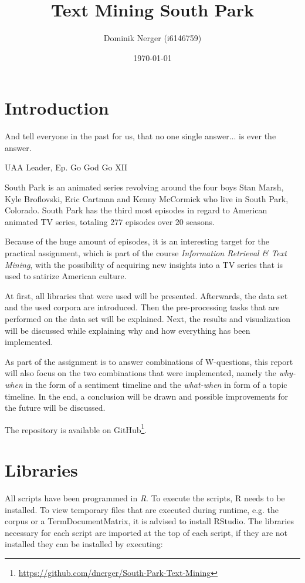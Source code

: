 \documentclass[10pt,a4paper]{article}
\author{Dominik Nerger (i6146759)}
\title{Text Mining South Park}
\date{\today}
\begin{document}
	\maketitle
	
	\tableofcontents
	\newpage
	\clearpage
	\setcounter{page}{1}
	\section{Introduction}
	\epigraph{ And tell everyone in the past for us, that no one single answer... is ever the answer. }{UAA Leader, Ep. Go God Go XII}

	South Park is an animated series revolving around the four boys Stan Marsh, Kyle Broflovski, Eric Cartman and Kenny McCormick who live in South Park, Colorado. South Park has the third most episodes in regard to American animated TV series, totaling 277 episodes over 20 seasons. 
	
	Because of the huge amount of episodes, it is an interesting target for the practical assignment, which is part of the course \textit{Information Retrieval \& Text Mining}, with the possibility of acquiring new insights into a TV series that is used to satirize American culture. 

	
	At first, all libraries that were used will be presented. Afterwards, the data set and the used corpora are introduced.  Then the pre-processing tasks that are performed on the data set will be explained. Next, the results and visualization will be discussed while explaining why and how everything has been implemented.
	
	
	As part of the assignment is to answer combinations of W-questions, this report will also focus on the two combinations that were implemented, namely the \textit{why-when} in the form of a sentiment timeline and the \textit{what-when} in form of a topic timeline.
	In the end, a conclusion will be drawn and possible improvements for the future will be discussed.	
	
	
	The repository is available on GitHub\footnote{\url{https://github.com/dnerger/South-Park-Text-Mining}}.
	\section{Libraries}
	
	All scripts have been programmed in \textit{R}. To execute the scripts, R needs to be installed. To view temporary files that are executed during runtime, e.g. the corpus or a TermDocumentMatrix, it is advised to install RStudio. The libraries necessary for each script are imported at the top of each script, if they are not installed they can be installed by executing:
	
\end{document}
